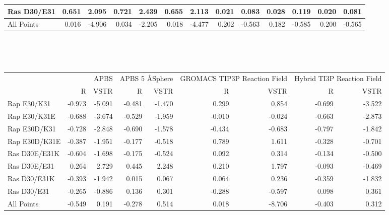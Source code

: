 \documentclass[landscape]{article}
\begin{document}
{\begin{tabular}{ l || r r | r r | r r | r r| r r | r r}
Ras D30/E31    & 0.651          & 2.095          & 0.721          & 2.439          & 0.655          & 2.113          & 0.021          & 0.083          & 0.028          & 0.119          & 0.020          & 0.081         \\
\hline
All Points     & 0.016          & -4.906         & 0.034          & -2.205         & 0.018          & -4.477         & 0.202          & -0.563         & 0.182          & -0.585         & 0.200          & -0.565        \\
\end{tabular}\\
}\\
{
\begin{tabular}{ l || r r| r r| r r| r r}
 & \multicolumn{2}{|C{2cm}}{APBS} & \multicolumn{2}{|C{2cm}}{APBS 5 \AA  Sphere} & \multicolumn{2}{|C{2cm}}{GROMACS TIP3P Reaction Field} & \multicolumn{2}{|C{2cm}}{Hybrid TI3P Reaction Field} \\
 & \multicolumn{1}{|C{1cm}}{R} & \multicolumn{1}{C{1cm}}{VSTR} & \multicolumn{1}{|C{1cm}}{R} & \multicolumn{1}{C{1cm}}{VSTR} & \multicolumn{1}{|C{1cm}}{R} & \multicolumn{1}{C{1cm}}{VSTR} & \multicolumn{1}{|C{1cm}}{R} & \multicolumn{1}{C{1cm}}{VSTR} \\
\hline\hline
Rap E30/K31    & -0.973         & -5.091         & -0.481         & -1.470         & 0.299          & 0.854          & -0.699         & -3.522        \\
Rap E30/K31E   & -0.688         & -3.674         & -0.529         & -1.959         & -0.010         & -0.024         & -0.663         & -2.873        \\
Rap E30D/K31   & -0.728         & -2.848         & -0.690         & -1.578         & -0.434         & -0.683         & -0.797         & -1.842        \\
Rap E30D/K31E  & -0.387         & -1.951         & -0.177         & -0.518         & 0.789          & 1.611          & -0.328         & -0.701        \\
Ras D30E/E31K  & -0.604         & -1.698         & -0.175         & -0.524         & 0.092          & 0.314          & -0.134         & -0.500        \\
Ras D30E/E31   & 0.264          & 2.729          & 0.445          & 2.248          & 0.210          & 1.797          & -0.093         & -0.469        \\
Ras D30/E31K   & -0.393         & -1.942         & 0.015          & 0.067          & 0.064          & 0.236          & -0.359         & -1.832        \\
Ras D30/E31    & -0.265         & -0.886         & 0.136          & 0.301          & -0.288         & -0.597         & 0.098          & 0.361         \\
\hline
All Points     & -0.549         & 0.191          & -0.278         & 0.514          & 0.018          & -8.706         & -0.403         & 0.312         \\
\end{tabular}\\
}\\
\end{document}
